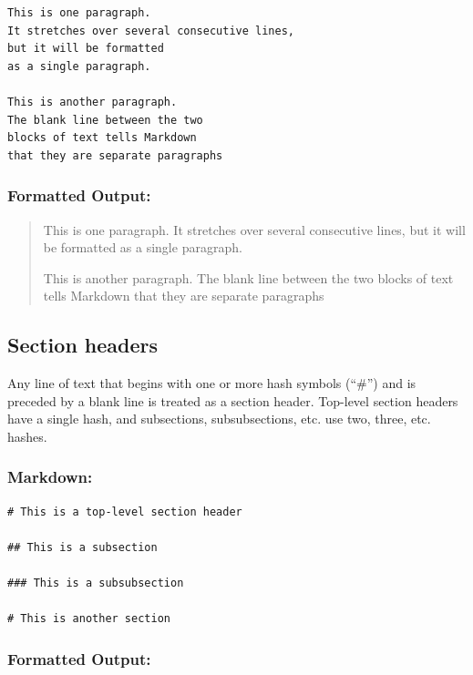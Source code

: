 \documentclass[
]{article}
\begin{document}
\begin{verbatim}
This is one paragraph.
It stretches over several consecutive lines,
but it will be formatted 
as a single paragraph.

This is another paragraph.
The blank line between the two
blocks of text tells Markdown
that they are separate paragraphs
\end{verbatim}

\hypertarget{formatted-output}{%
\subsubsection{Formatted Output:}\label{formatted-output}}

\begin{quote}
This is one paragraph. It stretches over several consecutive lines, but
it will be formatted as a single paragraph.

This is another paragraph. The blank line between the two blocks of text
tells Markdown that they are separate paragraphs
\end{quote}

\hypertarget{section-headers}{%
\subsection{Section headers}\label{section-headers}}

Any line of text that begins with one or more hash symbols (``\#'') and
is preceded by a blank line is treated as a section header. Top-level
section headers have a single hash, and subsections, subsubsections,
etc. use two, three, etc. hashes.

\hypertarget{markdown-2}{%
\subsubsection{Markdown:}\label{markdown-2}}

\begin{verbatim}
# This is a top-level section header

## This is a subsection

### This is a subsubsection

# This is another section
\end{verbatim}

\hypertarget{formatted-output-1}{%
\subsubsection{Formatted Output:}\label{formatted-output-1}}
\end{document}
